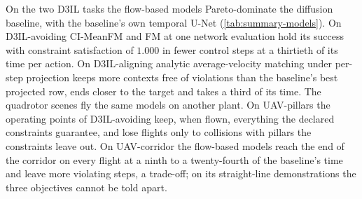 On the two D3IL tasks the flow-based models Pareto-dominate the diffusion baseline, with the baseline's own
temporal U-Net (\autoref{tab:summary-models}). On D3IL-avoiding CI-MeanFM and FM at one network evaluation
hold its success with constraint satisfaction of $1.000$ in fewer control steps at a thirtieth of its time
per action. On D3IL-aligning analytic average-velocity matching under per-step projection keeps more contexts
free of violations than the baseline's best projected row, ends closer to the target and takes a third of its
time. The quadrotor scenes fly the same models on another plant. On UAV-pillars the operating points of
D3IL-avoiding keep, when flown, everything the declared constraints guarantee, and lose flights only to
collisions with pillars the constraints leave out. On UAV-corridor the flow-based models reach the end of the
corridor on every flight at a ninth to a twenty-fourth of the baseline's time and leave more violating steps,
a trade-off; on its straight-line demonstrations the three objectives cannot be told apart.

